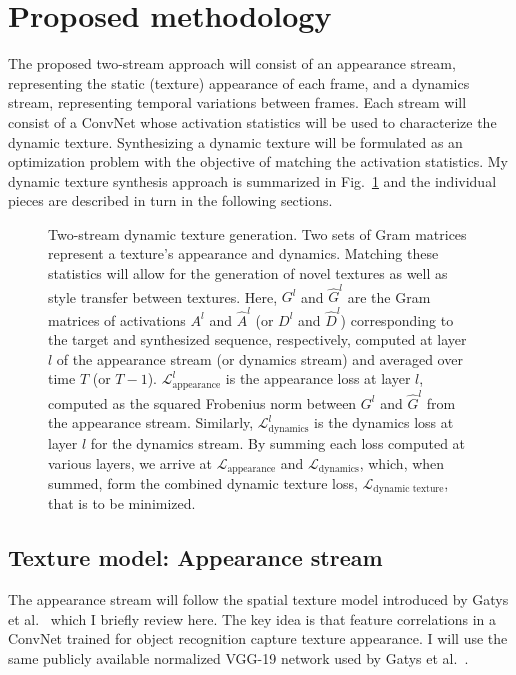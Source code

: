 \section{Proposed methodology}

The proposed two-stream approach will consist of an appearance
stream, representing the static (texture) appearance of each frame,
and a dynamics stream, representing temporal 
variations between frames.
Each stream will consist of a ConvNet whose activation 
statistics will be used to characterize the dynamic texture.
Synthesizing a dynamic texture will be formulated as an optimization 
problem with the objective of matching the activation 
statistics.
My dynamic texture synthesis approach is summarized in Fig.\ \ref{fig:architecture}
and the individual pieces are described in turn in the
following sections.

\begin{figure}[t]
\begin{center}
\end{center}
\vspace{-0.45cm}
\caption{Two-stream dynamic texture generation.
Two sets of Gram matrices represent a texture's appearance and 
dynamics.
Matching these statistics will allow for the generation of novel
textures as well as style transfer between textures. Here, $G^l$ and $\hat{G}^l$ are the Gram matrices of activations $A^l$ and $\hat{A}^l$ (or $D^l$ and $\hat{D}^l$) corresponding to the target and synthesized sequence, respectively, computed at layer $l$ of the appearance stream (or dynamics stream) and averaged over time $T$ (or $T-1$). $\mathcal{L}_\text{appearance}^l$ is the appearance loss at layer $l$, computed as the squared Frobenius norm between $G^l$ and $\hat{G}^l$ from the appearance stream. Similarly, $\mathcal{L}_\text{dynamics}^l$ is the dynamics loss at layer $l$ for the dynamics stream. By summing each loss computed at various layers, we arrive at $\mathcal{L}_\text{appearance}$ and $\mathcal{L}_\text{dynamics}$, which, when summed, form the combined dynamic texture loss, $\mathcal{L}_\text{dynamic texture}$, that is to be minimized.}
\label{fig:architecture}
\end{figure}


\subsection{Texture model: Appearance stream}
The appearance stream will follow the spatial texture model
introduced by Gatys et al.\ \cite{gatys2015} which I
briefly review here.
The key idea is that feature correlations in a 
ConvNet trained for 
object recognition  
capture texture appearance.
I will use the same publicly available normalized VGG-19 network \cite{simonyan2014very} used by Gatys et al.\ \cite{gatys2015}.

